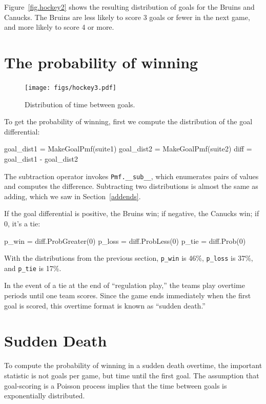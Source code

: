 \documentclass[12pt]{book}
\theoremstyle{exercise}
\begin{document}
Figure~\ref{fig.hockey2} shows the resulting distribution of goals for
the Bruins and Canucks.  The Bruins are less likely to
score 3 goals or fewer in the next game, and more likely to score 4 or
more.


\section{The probability of winning}

\begin{figure}
\centerline{\texttt{[image: figs/hockey3.pdf]}}
\caption{Distribution of time between goals.}
\label{fig.hockey3}
\end{figure}

To get the probability of winning, first we compute the
distribution of the goal differential:

\begin{code}
    goal_dist1 = MakeGoalPmf(suite1)
    goal_dist2 = MakeGoalPmf(suite2)
    diff = goal_dist1 - goal_dist2
\end{code}  

The subtraction operator invokes \verb"Pmf.__sub__", which enumerates
pairs of values and computes the difference.  Subtracting two
distributions is almost the same as adding, which we saw in
Section~\ref{addends}.

If the goal differential is positive, the Bruins win; if negative, the
Canucks win; if 0, it's a tie:

\begin{code}
    p_win = diff.ProbGreater(0)
    p_loss = diff.ProbLess(0)
    p_tie = diff.Prob(0)
\end{code}  

With the distributions from the previous section, \verb"p_win"
is 46\%, \verb"p_loss" is 37\%, and \verb"p_tie" is 17\%.

In the event of a tie at the end of ``regulation play,'' the teams play
overtime periods until one team scores.  Since the game ends
immediately when the first goal is scored, this overtime format
is known as ``sudden death.''


\section{Sudden Death}

To compute the probability of winning in a sudden death overtime,
the important statistic is not goals per game, but time until the
first goal.  The assumption that goal-scoring is a Poisson process
implies that the time between goals
is exponentially distributed.
\end{document}
